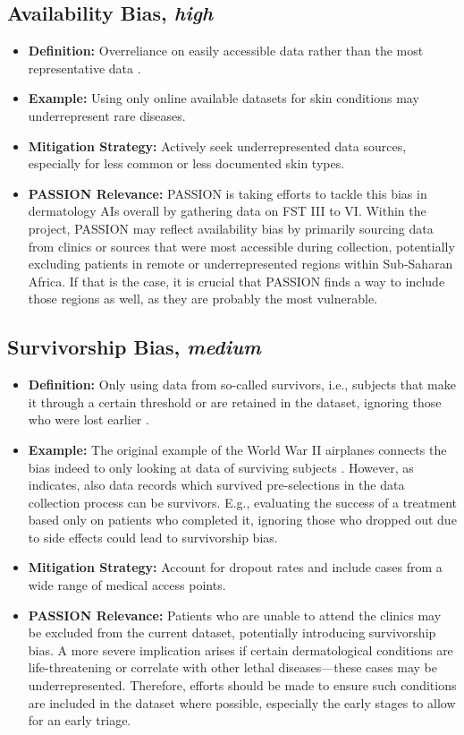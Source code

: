 \documentclass[12pt, a4paper, oneside]{book}   	%
\begin{document}
\begin{appendices}
		\subsection{Availability Bias, \textit{high}}
		\begin{itemize}
			\item \textbf{Definition:} Overreliance on easily accessible data rather than the most representative data \autocites{Chakraborty_2024, c9, c10}.
			\item \textbf{Example:} Using only online available datasets for skin conditions may underrepresent rare diseases.
			\item \textbf{Mitigation Strategy:} Actively seek underrepresented data sources, especially for less common or less documented skin types.
			\item \textbf{PASSION Relevance:} PASSION is taking efforts to tackle this bias in dermatology \glspl{AI} overall by gathering data on \gls{FST} III to VI. Within the project, PASSION may reflect availability bias by primarily sourcing data from clinics or sources that were most accessible during collection, potentially excluding patients in remote or underrepresented regions within Sub-Saharan Africa. If that is the case, it is crucial that PASSION finds a way to include those regions as well, as they are probably the most vulnerable.
		\end{itemize}
		
		\subsection{Survivorship Bias, \textit{medium}}
		\begin{itemize}
			\item \textbf{Definition:} Only using data from so-called survivors, i.e., subjects that make it through a certain threshold or are retained in the dataset, ignoring those who were lost earlier \autocite{Mester_2022, Silfwer_2017}.
			\item \textbf{Example:} The original example of the World War II airplanes connects the bias indeed to only looking at data of surviving subjects \autocite{Silfwer_2017}. However, as \textcite{Mester_2022} indicates, also data records which survived pre-selections in the data collection process can be survivors. E.g., evaluating the success of a treatment based only on patients who completed it, ignoring those who dropped out due to side effects could lead to survivorship bias.
			\item \textbf{Mitigation Strategy:} Account for dropout rates and include cases from a wide range of medical access points.
			\item \textbf{PASSION Relevance:} Patients who are unable to attend the clinics may be excluded from the current dataset, potentially introducing survivorship bias. A more severe implication arises if certain dermatological conditions are life-threatening or correlate with other lethal diseases—these cases may be underrepresented. Therefore, efforts should be made to ensure such conditions are included in the dataset where possible, especially the early stages to allow for an early triage.
		\end{itemize}
		

\end{appendices}
\end{document}

